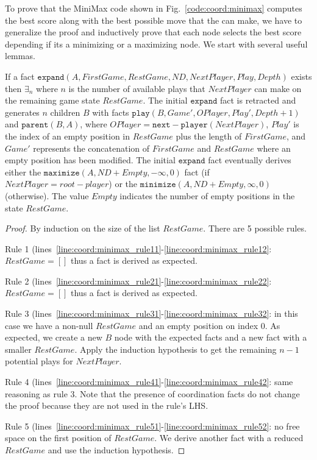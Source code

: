 To prove that the MiniMax code shown in Fig.~\ref{code:coord:minimax} computes
the best score along with the best possible move that the  can
make, we have to generalize the proof and inductively prove that each node
selects the best score depending if its a minimizing or a maximizing node. We
start with several useful lemmas.

\begin{lemma}

If a fact $\mathtt{expand}(A, FirstGame, RestGame, ND,
NextPlayer, Play, Depth)$ exists then $\exists_n$ where $n$ is the number of
available plays that $NextPlayer$ can make on the remaining game state
$RestGame$. The initial $\mathtt{expand}$ fact is retracted and generates $n$
children $B$ with facts $\mathtt{play}(B, Game', OPlayer, Play', Depth + 1)$
and $\mathtt{parent}(B, A)$, where $OPlayer =
\mathtt{next-player}(NextPlayer)$, $Play'$ is the index of an empty position in
$RestGame$ plus the length of $FirstGame$, and $Game'$ represents the
concatenation of $FirstGame$ and $RestGame$ where an empty position has been
modified. The initial $\mathtt{expand}$ fact eventually derives either the
$\mathtt{maximize}(A, ND + Empty, -\infty, 0)$ fact (if
$NextPlayer = root-player$) or the $\mathtt{minimize}(A, ND +
Empty, \infty, 0)$ (otherwise).  The value $Empty$ indicates the number of empty
positions in the state $RestGame$.

\end{lemma}

\begin{proof}
By induction on the size of the list $RestGame$. There are 5 possible rules.

Rule 1 (lines~\ref{line:coord:minimax_rule11}-\ref{line:coord:minimax_rule12}:
$RestGame = []$ thus a  fact is derived as expected.

Rule 2 (lines~\ref{line:coord:minimax_rule21}-\ref{line:coord:minimax_rule22}:
$RestGame = []$ thus a  fact is derived as expected.

Rule 3 (lines~\ref{line:coord:minimax_rule31}-\ref{line:coord:minimax_rule32}:
in this case we have a non-null $RestGame$ and an empty position on index 0. As
expected, we create a new $B$ node with the expected facts and a new 
fact with a smaller $RestGame$. Apply the induction hypothesis to get the
remaining $n-1$ potential plays for $NextPlayer$.

Rule 4 (lines~\ref{line:coord:minimax_rule41}-\ref{line:coord:minimax_rule42}:
same reasoning as rule 3. Note that the presence of coordination facts do not
change the proof because they are not used in the rule's LHS.

Rule 5 (lines~\ref{line:coord:minimax_rule51}-\ref{line:coord:minimax_rule52}:
no free space on the first position of $RestGame$. We derive another
 fact with a reduced $RestGame$ and use the induction
hypothesis.

\end{proof}

